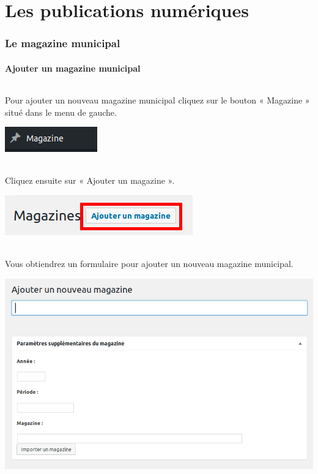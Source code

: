 \documentclass[10pt,a4paper]{article}
\begin{document}
\part{Les publications numériques}
\newpage

\section{Le magazine municipal}
\subsection{Ajouter un magazine municipal}
\paragraph{}Pour ajouter un nouveau magazine municipal cliquez sur le bouton « Magazine » situé dans le menu de gauche.
\begin{center}
\includegraphics[scale=0.3]{img/0322.png}
\end{center}
\paragraph{}Cliquez ensuite sur « Ajouter un magazine ».
\begin{center}
\includegraphics[scale=0.3]{img/0323.png}
\end{center}
\paragraph{}Vous obtiendrez un formulaire pour ajouter un nouveau magazine municipal.
\begin{center}
\includegraphics[scale=0.3]{img/0324.png}
\end{center}
\end{document}
